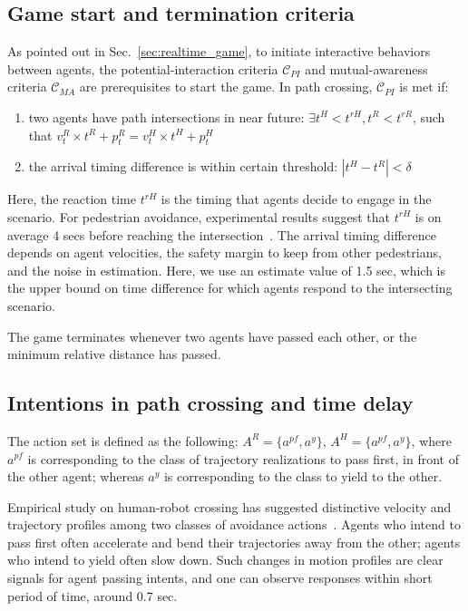 \documentclass[letterpaper, 10 pt, conference]{ieeeconf}  %
\begin{document}
\subsection{Game start and termination criteria}
\vspace{-.2em}
As pointed out in Sec.~\ref{sec:realtime_game}, to initiate interactive 
behaviors between agents, the potential-interaction criteria $\mathcal{C}_{PI}$ 
and mutual-awareness criteria $\mathcal{C}_{MA}$ are prerequisites to start the 
game. In path crossing, $\mathcal{C}_{PI}$ is met if:
\begin{enumerate}
  \item two agents have path intersections in near future: 
    $\exists t^H<t^{rH}, t^R<t^{rR}$, such that $v^R_t \times t^R + p^R_t = v^H_t \times t^H +p^H_t$
  \item the arrival timing difference is within certain threshold: $|t^H-t^R|<\delta$
\end{enumerate}
Here, the reaction time $t^{rH}$ is the timing that agents decide to 
engage in the scenario. For pedestrian avoidance, experimental results suggest 
that $t^{rH}$ is on average 4 secs before reaching the intersection~\cite{pettre2009experiment}. 
The arrival timing difference depends on agent velocities, the safety margin 
to keep from other pedestrians, and the noise in estimation. Here, we use an 
estimate value of 1.5 sec, which is the upper bound on time difference for 
which agents respond to the intersecting scenario.

The game terminates whenever two agents have passed each other, or the 
minimum relative distance has passed.
\vspace{-.2em}
\subsection{Intentions in path crossing and time delay}
\vspace{-.2em}
The action set is defined as the following: $A^R = \{a^{pf}, a^y\}$, 
$A^H = \{a^{pf},a^y\}$, where $a^{pf}$ is corresponding to the class of 
trajectory realizations to pass first, in front of the other agent; whereas 
$a^y$ is corresponding to the class to yield to the other. 

Empirical study on human-robot crossing has suggested distinctive velocity and 
trajectory profiles among two classes of avoidance 
actions~\cite{paris2007pedestrian}. Agents who intend to pass first often 
accelerate and bend their trajectories away from the other; agents who intend 
to yield often slow down. Such changes in motion profiles are clear 
signals for agent passing intents, and one can observe responses within short period of time, around 0.7 sec.
\end{document}
